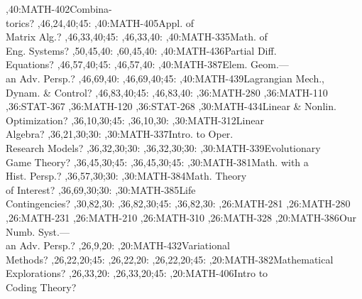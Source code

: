\documentclass{article}
\begin{document}
\begin{chart}
,40:{MATH-402}{Combina-\\torics}{?}
  ,46,24,40;45:
,40:{MATH-405}{Appl. of\\Matrix Alg.}{?}
  ,46,33,40;45:
  ,46,33,40:
,40:{MATH-335}{Math. of\\Eng. Systems}{?}
  ,50,45,40:
  ,60,45,40:
,40:{MATH-436}{Partial Diff.\\Equations}{?}
  ,46,57,40;45:
  ,46,57,40:
,40:{MATH-387}{Elem. Geom.---\\an Adv. Persp.}{?}
  ,46,69,40:
  ,46,69,40;45:
,40:{MATH-439}{Lagrangian Mech.,\\Dynam. \& Control}{?}
  ,46,83,40;45:
  ,46,83,40:
,36:{MATH-280}
,36:{MATH-110}
,36:{STAT-367}
,36:{MATH-120}
,36:{STAT-268}
,30:{MATH-434}{Linear \& Nonlin.\\Optimization}{?}
  ,36,10,30;45:
  ,36,10,30:
,30:{MATH-312}{Linear\\Algebra}{?}
  ,36,21,30;30:
,30:{MATH-337}{Intro. to Oper.\\Research Models}{?}
  ,36,32,30;30:
  ,36,32,30;30:
,30:{MATH-339}{Evolutionary\\Game Theory}{?}
  ,36,45,30;45:
  ,36,45,30;45:
,30:{MATH-381}{Math. with a\\Hist. Persp.}{?}
  ,36,57,30;30:
,30:{MATH-384}{Math. Theory\\of Interest}{?}
  ,36,69,30;30:
,30:{MATH-385}{Life\\Contingencies}{?}
  ,30,82,30:
  ,36,82,30;45:
  ,36,82,30:
,26:{MATH-281}
,26:{MATH-280}
,26:{MATH-231}
,26:{MATH-210}
,26:{MATH-310}
,26:{MATH-328}
,20:{MATH-386}{Our Numb. Syst.---\\an Adv. Persp.}{?}
  ,26,9,20:
,20:{MATH-432}{Variational\\Methods}{?}
  ,26,22,20;45:
  ,26,22,20:
  ,26,22,20;45:
,20:{MATH-382}{Mathematical\\Explorations}{?}
  ,26,33,20:
  ,26,33,20;45:
,20:{MATH-406}{Intro to\\Coding Theory}{?}

\end{chart}
\end{document}
